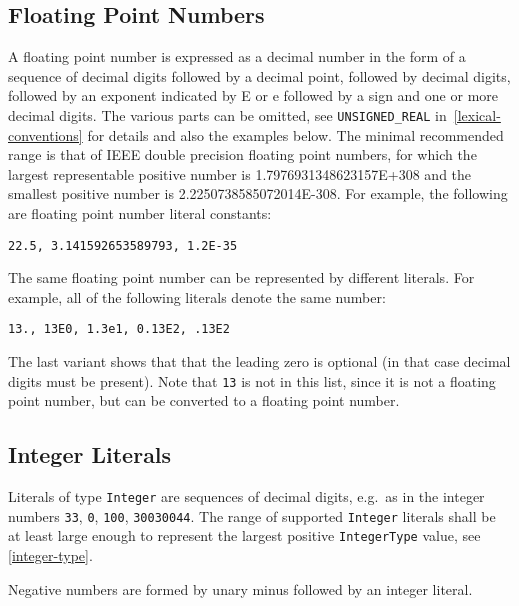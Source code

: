 \subsection{Floating Point Numbers}

A floating point number is expressed as a decimal number in the form of
a sequence of decimal digits followed by a decimal point, followed by decimal digits,
followed by an exponent indicated by E or e followed by a sign
and one or more decimal digits. The various parts can be omitted, see \lstinline!UNSIGNED_REAL! in~\autoref{lexical-conventions} for
details and also the examples below. The minimal recommended range is
that of IEEE double precision floating point numbers, for which the
largest representable positive number is 1.7976931348623157E+308 and the
smallest positive number is 2.2250738585072014E-308. For example, the
following are floating point number literal constants:
\begin{lstlisting}[language=modelica]
22.5, 3.141592653589793, 1.2E-35
\end{lstlisting}

The same floating point number can be represented by different literals.
For example, all of the following literals denote the same number:
\begin{lstlisting}[language=modelica]
13., 13E0, 1.3e1, 0.13E2, .13E2
\end{lstlisting}
The last variant shows that that the leading zero is optional (in that case decimal digits must be present).
Note that \lstinline!13! is not in this list, since it is not a floating point number,
but can be converted to a floating point number.

\subsection{Integer Literals}

Literals of type \lstinline!Integer! are sequences of decimal digits, e.g.\ as in the integer numbers \lstinline!33!, \lstinline!0!, \lstinline!100!, \lstinline!30030044!.
The range of supported \lstinline!Integer! literals shall be at least large enough to represent the largest positive \lstinline!IntegerType! value, see \autoref{integer-type}.

\begin{nonnormative}
Negative numbers are formed by unary minus followed by an integer literal.
\end{nonnormative}

